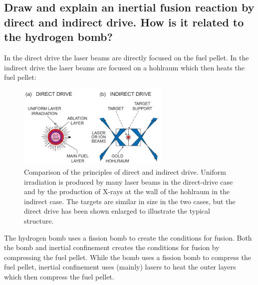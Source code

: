 \subsection{Draw and explain an inertial fusion reaction by direct and indirect drive. How is it related to the hydrogen bomb?}
\begin{multisolutionblock}
    
    In the direct drive the laser beams are directly focused on the fuel pellet. In the indirect drive the laser beams are focused on a hohlraum which then heats the fuel pellet:\\
    \begin{figure}[H]
        \centering
        \includegraphics[width=0.65\textwidth]{chapters/fig/7_direct_indirect_drive.png}
        \caption{Comparison of the principles of direct and indirect drive. Uniform irradiation is
        produced by many laser beams in the direct-drive case and by the production of X-rays at the wall
        of the hohlraum in the indirect case. The targets are similar in size in the two cases, but the direct
        drive has been shown enlarged to illustrate the typical structure.}
        \label{fig:7_direct_indirect_drive}
    \end{figure}
    The hydrogen bomb uses a fission bomb to create the conditions for fusion. Both the bomb and inertial confinement creates the conditions for fusion by compressing the fuel pellet. While the bomb uses a fission bomb to compress the fuel pellet, inertial confinement uses (mainly) lasers to heat the outer layers which then compress the fuel pellet.
\end{multisolutionblock}


